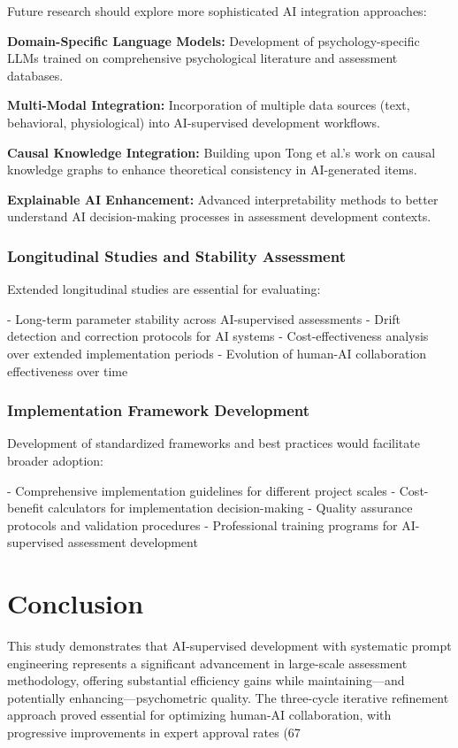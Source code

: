 \documentclass[12pt,a4paper]{article}
\begin{document}
Future research should explore more sophisticated AI integration approaches:

\textbf{Domain-Specific Language Models:} Development of psychology-specific LLMs trained on comprehensive psychological literature and assessment databases.

\textbf{Multi-Modal Integration:} Incorporation of multiple data sources (text, behavioral, physiological) into AI-supervised development workflows.

\textbf{Causal Knowledge Integration:} Building upon Tong et al.'s \cite{Tong2024} work on causal knowledge graphs to enhance theoretical consistency in AI-generated items.

\textbf{Explainable AI Enhancement:} Advanced interpretability methods to better understand AI decision-making processes in assessment development contexts.

\subsubsection{Longitudinal Studies and Stability Assessment}

Extended longitudinal studies are essential for evaluating:

- Long-term parameter stability across AI-supervised assessments
- Drift detection and correction protocols for AI systems
- Cost-effectiveness analysis over extended implementation periods
- Evolution of human-AI collaboration effectiveness over time

\subsubsection{Implementation Framework Development}

Development of standardized frameworks and best practices would facilitate broader adoption:

- Comprehensive implementation guidelines for different project scales
- Cost-benefit calculators for implementation decision-making
- Quality assurance protocols and validation procedures
- Professional training programs for AI-supervised assessment development

\section{Conclusion}

This study demonstrates that AI-supervised development with systematic prompt engineering represents a significant advancement in large-scale assessment methodology, offering substantial efficiency gains while maintaining—and potentially enhancing—psychometric quality. The three-cycle iterative refinement approach proved essential for optimizing human-AI collaboration, with progressive improvements in expert approval rates (67%
\end{document}
